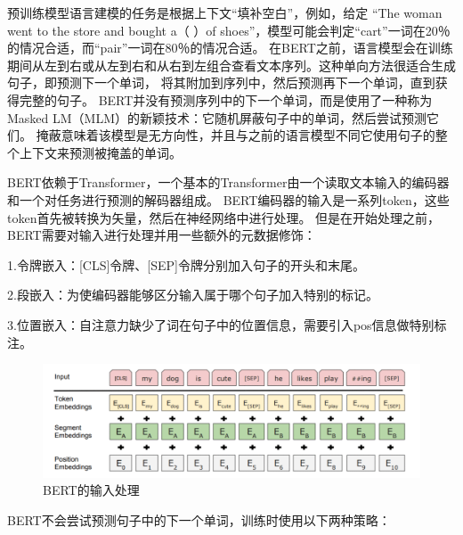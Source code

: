 预训练模型语言建模的任务是根据上下文“填补空白”\cite{marcelino2018transfer}，例如，给定
“The woman went to the store and bought a（ ）of shoes”，模型可能会判定“cart”一词在20％的情况合适，而“pair”一词在80％的情况合适。
在BERT之前，语言模型会在训练期间从左到右或从左到右和从右到左组合查看文本序列。这种单向方法很适合生成句子，即预测下一个单词，
将其附加到序列中，然后预测再下一个单词，直到获得完整的句子。
BERT并没有预测序列中的下一个单词，而是使用了一种称为Masked LM（MLM）的新颖技术：它随机屏蔽句子中的单词，然后尝试预测它们。
掩蔽意味着该模型是无方向性，并且与之前的语言模型不同它使用句子的整个上下文来预测被掩盖的单词。


BERT依赖于Transformer，一个基本的Transformer由一个读取文本输入的编码器和一个对任务进行预测的解码器组成。
BERT编码器的输入是一系列token，这些token首先被转换为矢量，然后在神经网络中进行处理。
但是在开始处理之前，BERT需要对输入进行处理并用一些额外的元数据修饰：

1.令牌嵌入：[CLS]令牌、[SEP]令牌分别加入句子的开头和末尾。

2.段嵌入：为使编码器能够区分输入属于哪个句子加入特别的标记。

3.位置嵌入：自注意力缺少了词在句子中的位置信息，需要引入pos信息做特别标注。
\begin{figure}[htbp]
  \centering
  \includegraphics[scale=0.5]{./images/inputBert.jpg}
  \caption{BERT的输入处理\cite{devlin2018bert}}
  \label{fig:inputBert}
\end{figure}

BERT不会尝试预测句子中的下一个单词，训练时使用以下两种策略：

